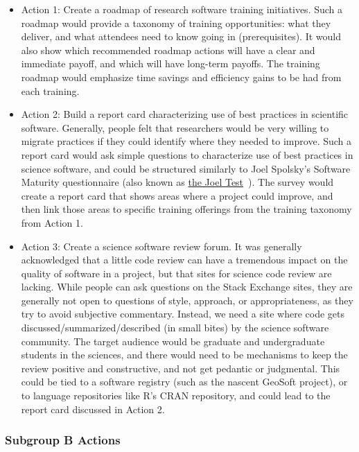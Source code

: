 \documentclass[11pt, oneside]{amsart}
\begin{document}
\begin{itemize}
\item Action 1: Create a roadmap of research software training initiatives. Such
a roadmap would provide a taxonomy of training opportunities: what they deliver,
and what attendees need to know going in (prerequisites). It would also show
which recommended roadmap actions will have a clear and immediate payoff, and
which will have long-term payoffs. The training roadmap would emphasize time
savings and efficiency gains to be had from each training.

\item Action 2: Build a report card characterizing use of best practices in
scientific software. Generally, people felt that researchers would be very
willing to migrate practices if they could identify where they needed to
improve. Such a report card would ask simple questions to characterize use of
best practices in science software, and could be structured similarly to Joel
Spolsky's Software Maturity questionnaire (also known as
\href{http://www.joelonsoftware.com/articles/fog0000000043.html}{the Joel
Test}~\cite{joel-test}). The survey would create a report card that shows areas
where a project could improve, and then link those areas to specific training
offerings from the training taxonomy from Action 1.

\item Action 3: Create a science software review forum. It was generally
acknowledged that a little code review can have a tremendous impact on the
quality of software in a project, but that sites for science code review are
lacking. While people can ask questions on the Stack Exchange sites, they are
generally not open to questions of style, approach, or appropriateness, as they
try to avoid subjective commentary. Instead, we need a site where code gets
discussed/summarized/described (in small bites) by the science software
community. The target audience would be graduate and undergraduate students in
the sciences, and there would need to be mechanisms to keep the review positive
and constructive, and not get pedantic or judgmental. This could be tied to a
software registry (such as the nascent GeoSoft project), or to language
repositories like R's CRAN repository, and could lead to the report card
discussed in Action 2.
\end{itemize}

\subsubsection{Subgroup B Actions}
\end{document}
